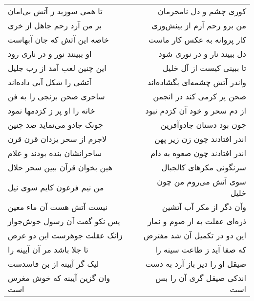 \begin{center}
\begin{longtable}{l p{0.5cm} r}
\\
تا همی سوزید ز آتش بی‌امان
&&
کوری چشم و دل نامحرمان
\\
بر من آرد رحم جاهل از خری
&&
من برو رحم آرم از بینش‌وری
\\
خاصه این آتش که جان آبهاست
&&
کار پروانه به عکس کار ماست
\\
او ببینند نور و در ناری رود
&&
دل ببیند نار و در نوری شود
\\
این چنین لعب آمد از رب جلیل
&&
تا ببینی کیست از آل خلیل
\\
آتشی را شکل آبی داده‌اند
&&
واندر آتش چشمه‌ای بگشاده‌اند
\\
ساحری صحن برنجی را به فن
&&
صحن پر کرمی کند در انجمن
\\
خانه را او پر ز کزدمها نمود
&&
از دم سحر و خود آن کزدم نبود
\\
چونک جادو می‌نماید صد چنین
&&
چون بود دستان جادوآفرین
\\
لاجرم از سحر یزدان قرن قرن
&&
اندر افتادند چون زن زیر پهن
\\
ساحرانشان بنده بودند و غلام
&&
اندر افتادند چون صعوه به دام
\\
هین بخوان قرآن ببین سحر حلال
&&
سرنگونی مکرهای کالجبال
\\
من نیم فرعون کایم سوی نیل
&&
سوی آتش می‌روم من چون خلیل
\\
نیست آتش هست آن ماء معین
&&
وآن دگر از مکر آب آتشین
\\
پس نکو گفت آن رسول خوش‌جواز
&&
ذره‌ای عقلت به از صوم و نماز
\\
زانک عقلت جوهرست این دو عرض
&&
این دو در تکمیل آن شد مفترض
\\
تا جلا باشد مر آن آیینه را
&&
که صفا آید ز طاعت سینه را
\\
لیک گر آیینه از بن فاسدست
&&
صیقل او را دیر باز آرد به دست
\\
وان گزین آیینه که خوش مغرس است
&&
اندکی صیقل گری آن را بس است
\\
\end{longtable}
\end{center}
